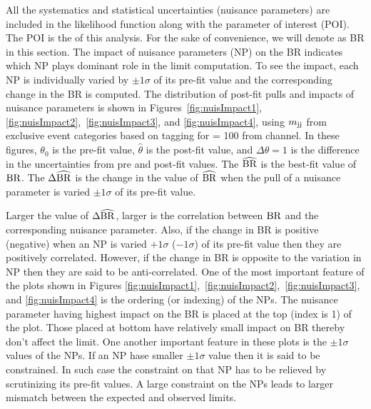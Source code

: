 All the systematics and statistical uncertainties (nuisance 
parameters) are included in the likelihood function along with the 
parameter of interest (POI). The POI is the \brThb of this analysis. 
For the sake of convenience, we will denote \brThb as \rm{BR} in this 
section. The impact of nuisance parameters (NP) on the \rm{BR} 
indicates which NP plays dominant role in the limit computation. To 
see the impact, each NP is individually varied by $\pm 1 \sigma$ of 
its pre-fit value and the corresponding change in the \rm{BR} is 
computed. The distribution of post-fit pulls and impacts of nuisance 
parameters is shown in Figures~\ref{fig:nuisImpact1}, 
\ref{fig:nuisImpact2},~\ref{fig:nuisImpact3}, and 
\ref{fig:nuisImpact4}, using $m_\text{jj}$ from exclusive event categories 
based on \PQc tagging for \mHp = 100 \GeV from \ljets channel. In 
these figures, $\theta_0$ is the pre-fit value, $\widehat{\theta}$ is 
the post-fit value, and $\Delta\theta = 1$ is the difference in the 
uncertainties from pre and post-fit values. The $\widehat{\rm{BR}}$ is 
the best-fit value of $\rm{BR}$. The $\Delta\widehat{\rm{BR}}$ is the 
change in the value of $\widehat{\rm{BR}}$ when the pull of a nuisance 
parameter is varied $\pm 1 \sigma$ of its pre-fit value. 

Larger the value of $\Delta\widehat{\rm{BR}}$, larger is the 
correlation between $\rm{BR}$ and the corresponding nuisance parameter. 
Also, if the change in \rm{BR} is positive (negative) when an NP is 
varied $+1\sigma$ ($-1\sigma$) of its pre-fit value then they are 
positively correlated. However, if the change in \rm{BR} is opposite 
to the variation in NP then they are said to be anti-correlated. One 
of the most important feature of the plots shown in Figures 
\ref{fig:nuisImpact1},~\ref{fig:nuisImpact2},~\ref{fig:nuisImpact3}, 
and \ref{fig:nuisImpact4} is the ordering (or indexing) of the NPs. 
The nuisance parameter having highest impact on the \rm{BR} is placed 
at the top (index is 1) of the plot. Those placed at bottom have 
relatively small impact on \rm{BR} thereby don't affect the limit. One 
another important feature in these plots is the $\pm 1\sigma$ values 
of the NPs. If an NP hase smaller $\pm 1\sigma$ value then it is said 
to be constrained. In such case the constraint on that NP has to be 
relieved by scrutinizing its pre-fit values. A large constraint on the 
NPs leads to larger mismatch between the expected and observed limits. 

